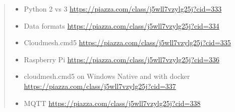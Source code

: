 \begin{quote}
\begin{itemize}
\tightlist
\item
  Python 2 vs 3 \url{https://piazza.com/class/j5wll7vzylg25j?cid=333}
\item
  Data formats \url{https://piazza.com/class/j5wll7vzylg25j?cid=334}
\item
  Cloudmesh.cmd5 \url{https://piazza.com/class/j5wll7vzylg25j?cid=335}
\item
  Raspberry Pi \url{https://piazza.com/class/j5wll7vzylg25j?cid=336}
\item
  cloudmesh.cmd5 on Windows Native and with docker
  \url{https://piazza.com/class/j5wll7vzylg25j?cid=337}
\item
  MQTT \url{https://piazza.com/class/j5wll7vzylg25j?cid=338}
\end{itemize}
\end{quote}
